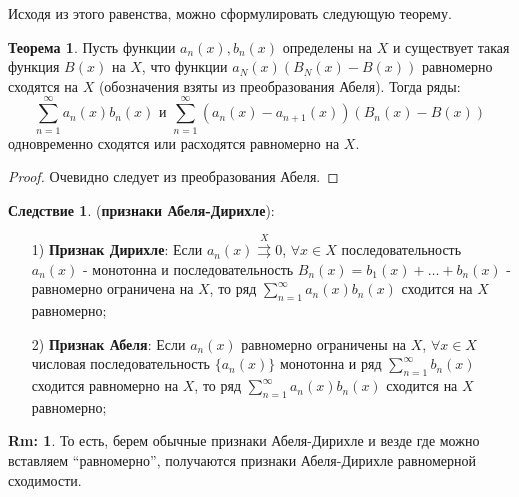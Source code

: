 \documentclass[12pt]{article}
\theoremstyle{definition}
\newtheorem{rem}{Rm:}
\newtheorem{theorem}{Теорема}
\newtheorem{corollary}{Следствие}
\newcommand{\ddsum}[2]{\displaystyle\sum\limits_{#1}^{#2}}
\newcommand{\uconv}[1]{\overset{#1}{\rightrightarrows}}
\begin{document}
Исходя из этого равенства, можно сформулировать следующую теорему.
\begin{theorem}
	Пусть функции $a_n(x), b_n(x)$ определены на $X$ и существует такая функция $B(x)$ на $X$, что функции $a_N(x)(B_N(x) - B(x))$ равномерно сходятся на $X$ (обозначения взяты из преобразования Абеля). Тогда ряды: 
	$$
		\ddsum{n = 1}{\infty}a_n(x) b_n(x) \text{ и } \ddsum{n = 1}{\infty}(a_n(x) - a_{n+1}(x))\left(B_n(x) - B(x)\right)
	$$ 
	одновременно сходятся или расходятся равномерно на $X$.
\end{theorem}
\begin{proof}
	Очевидно следует из преобразования Абеля.
\end{proof}

\begin{corollary}(\textbf{признаки Абеля-Дирихле}):
	\begin{itemize}
		\item[1)] \textbf{Признак Дирихле}: Если $a_n(x) \uconv{X} 0$, $\forall x \in X$ последовательность $a_n(x)$ - монотонна и последовательность $B_n(x) =b_1 (x)  + \dotsc + b_n(x)$ - равномерно ограничена на $X$, то ряд $\ddsum{n = 1}{\infty}a_n(x)b_n(x)$ сходится на $X$ равномерно;
		
		\item [2)] \textbf{Признак Абеля}: Если $a_n(x)$ равномерно ограничены на $X$, $\forall x\in X$ числовая последовательность $\{a_n(x)\}$ монотонна и ряд $\ddsum{n = 1}{\infty}b_n(x)$ сходится равномерно на $X$, то ряд $\ddsum{n = 1}{\infty}a_n(x)b_n(x)$ сходится на $X$ равномерно;
	\end{itemize}
\end{corollary}
\begin{rem}
	То есть, берем обычные признаки Абеля-Дирихле и везде где можно вставляем ``равномерно'', получаются признаки Абеля-Дирихле равномерной сходимости.
\end{rem}
\end{document}
